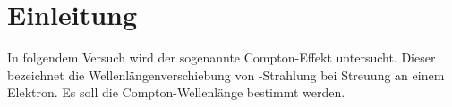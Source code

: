 \section{Einleitung}
\label{sec:einleitung}
In folgendem Versuch wird der sogenannte Compton-Effekt untersucht.
Dieser bezeichnet die Wellenlängenverschiebung von \gamma -Strahlung bei Streuung an einem Elektron.
Es soll die Compton-Wellenlänge bestimmt werden.
